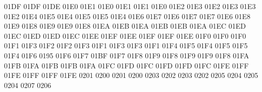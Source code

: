 \setcclcucx 01DF 01DF 01DE %
\setcclcucx 01E0 01E1 01E0 %
\setcclcucx 01E1 01E1 01E0 %
\setcclcucx 01E2 01E3 01E2 %
\setcclcucx 01E3 01E3 01E2 %
\setcclcucx 01E4 01E5 01E4 %
\setcclcucx 01E5 01E5 01E4 %
\setcclcucx 01E6 01E7 01E6 %
\setcclcucx 01E7 01E7 01E6 %
\setcclcucx 01E8 01E9 01E8 %
\setcclcucx 01E9 01E9 01E8 %
\setcclcucx 01EA 01EB 01EA %
\setcclcucx 01EB 01EB 01EA %
\setcclcucx 01EC 01ED 01EC %
\setcclcucx 01ED 01ED 01EC %
\setcclcucx 01EE 01EF 01EE %
\setcclcucx 01EF 01EF 01EE %
\setcclcucx 01F0 01F0 01F0 %
\setcclcucx 01F1 01F3 01F2 %
\setcclcucx 01F2 01F3 01F1 %
\setcclcucx 01F3 01F3 01F1 %
\setcclcucx 01F4 01F5 01F4 %
\setcclcucx 01F5 01F5 01F4 %
\setcclcucx 01F6 0195 01F6 %
\setcclcucx 01F7 01BF 01F7 %
\setcclcucx 01F8 01F9 01F8 %
\setcclcucx 01F9 01F9 01F8 %
\setcclcucx 01FA 01FB 01FA %
\setcclcucx 01FB 01FB 01FA %
\setcclcucx 01FC 01FD 01FC %
\setcclcucx 01FD 01FD 01FC %
\setcclcucx 01FE 01FF 01FE %
\setcclcucx 01FF 01FF 01FE %
 0201 0200 %
 0201 0200 %
 0203 0202 %
 0203 0202 %
 0205 0204 %
 0205 0204 %
 0207 0206 %
